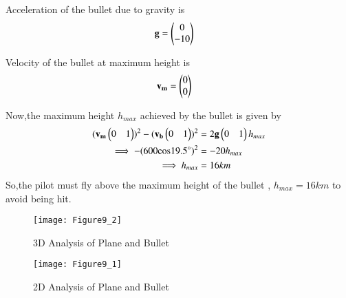 \documentclass[journal,12pt,twocolumn]{IEEEtran}
\begin{document}
Acceleration of the bullet due to gravity is
\begin{align}
    \mathbf{g} &= \begin{pmatrix}0 \\ -10\end{pmatrix}
\end{align}

Velocity of the bullet at maximum height is
\begin{align}
    \mathbf{v_m} &= \begin{pmatrix}0 \\ 0\end{pmatrix}
\end{align}

Now,the maximum height $h_{max}$ achieved by the bullet is given by
\begin{align}
    (\mathbf{v_m}\begin{pmatrix}0 & 1\end{pmatrix})^2- (\mathbf{v_b}\begin{pmatrix}0 & 1\end{pmatrix})^2 &= 2\mathbf{g}\begin{pmatrix}0 & 1\end{pmatrix}h_{max} 
    \\
    \implies -(600\text{cos}19.5\degree)^2 &= -20h_{max}
    \\
    \implies h_{max} &= 16 km
\end{align}
So,the pilot must fly above the maximum height of the bullet , $\boxed{h_{max} = 16 km}$ to avoid being hit.

\begin{figure}[!ht]
\centering
\texttt{[image: Figure9\_2]}
\caption{3D Analysis of Plane and Bullet}
\label{fig:3D}	
\end{figure}

\begin{figure}[!ht]
\centering
\texttt{[image: Figure9\_1]}
\caption{2D Analysis of Plane and Bullet}
\label{fig:2D}	
\end{figure}
\end{document}
